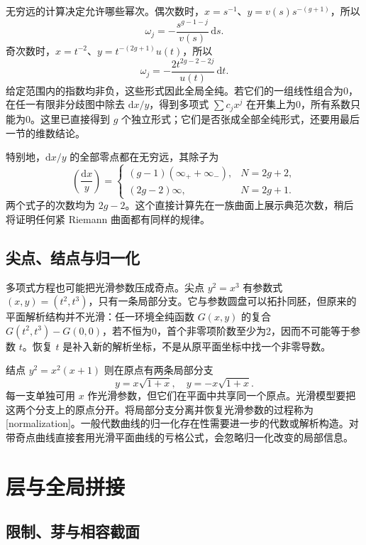 \ProseParagraphBreak
无穷远的计算决定允许哪些幂次。偶次数时，\(x=s^{-1}\)、\(y=v(s)s^{-(g+1)}\)，所以
\[
 \omega_j=-\frac{s^{g-1-j}}{v(s)}\,\mathrm{d}s.
\]
奇次数时，\(x=t^{-2}\)、\(y=t^{-(2g+1)}u(t)\)，所以
\[
 \omega_j=-\frac{2t^{2g-2-2j}}{u(t)}\,\mathrm{d}t.
\]
给定范围内的指数均非负，这些形式因此全局全纯。若它们的一组线性组合为0，在任一有限非分歧图中除去 \(\mathrm{d}x/y\)，得到多项式 \(\sum c_jx^j\) 在开集上为0，所有系数只能为0。这里已直接得到 \(g\) 个独立形式；它们是否张成全部全纯形式，还要用最后一节的维数结论。

\ProseParagraphBreak
特别地，\(\mathrm{d}x/y\) 的全部零点都在无穷远，其除子为
\[
 \left(\frac{\mathrm{d}x}{y}\right)=
 \begin{cases}
 (g-1)(\infty_++\infty_-),&N=2g+2,\\
 (2g-2)\infty,&N=2g+1.
 \end{cases}
\]
两个式子的次数均为 \(2g-2\)。这个直接计算先在一族曲面上展示典范次数，稍后将证明任何紧 Riemann 曲面都有同样的规律。

\subsection{尖点、结点与归一化}
\label{b3:subsec:A0404}

多项式方程也可能把光滑参数压成奇点。尖点 \(y^2=x^3\) 有参数式 \((x,y)=(t^2,t^3)\)，只有一条局部分支。它与参数圆盘可以拓扑同胚，但原来的平面解析结构并不光滑：任一环境全纯函数 \(G(x,y)\) 的复合 \(G(t^2,t^3)-G(0,0)\)，若不恒为0，首个非零项阶数至少为2，因而不可能等于参数 \(t\)。恢复 \(t\) 是补入新的解析坐标，不是从原平面坐标中找一个非零导数。

\ProseParagraphBreak
结点 \(y^2=x^2(x+1)\) 则在原点有两条局部分支
\[
 y=x\sqrt{1+x},\quad y=-x\sqrt{1+x}.
\]
每一支单独可用 \(x\) 作光滑参数，但它们在平面中共享同一个原点。光滑模型要把这两个分支上的原点分开。将局部分支分离并恢复光滑参数的过程称为[normalization]。一般代数曲线的归一化存在性需要进一步的代数或解析构造。对带奇点曲线直接套用光滑平面曲线的亏格公式，会忽略归一化改变的局部信息。

\section{层与全局拼接}
\label{b3:sec:A05}

\subsection{限制、芽与相容截面}
\label{b3:subsec:A0501}

